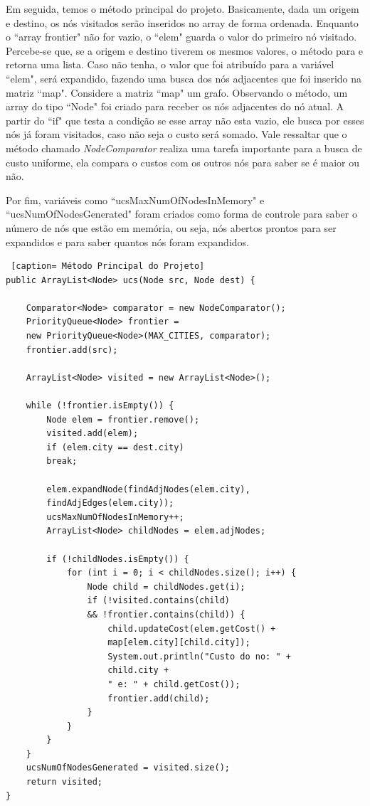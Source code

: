 \documentclass[12pt]{article}
\begin{document}
Em seguida, temos o método principal do projeto. Basicamente, dada um origem e destino, os nós visitados serão inseridos no array de forma ordenada. Enquanto o ``array frontier" não for vazio, o ``elem" guarda o valor do primeiro nó visitado. Percebe-se que, se a origem e destino tiverem os mesmos valores, o método para e retorna uma lista. Caso não tenha, o valor que foi atribuído para a variável ``elem", será expandido, fazendo uma busca dos nós adjacentes que foi inserido na matriz ``map". Considere a matriz ``map" um grafo. Observando o método, um array do tipo ``Node" foi criado para receber os nós adjacentes do nó atual. A partir do ``if" que testa a condição se esse array não esta vazio, ele busca por esses nós já foram visitados, caso não seja o custo será somado. Vale ressaltar que o método chamado \textit{NodeComparator} realiza uma tarefa importante para a busca de custo uniforme, ela compara o custos com os outros nós para saber se é maior ou não.

Por fim, variáveis como ``ucsMaxNumOfNodesInMemory" e ``ucsNumOfNodesGenerated" foram criados como forma de controle para saber o número de nós que estão em memória, ou seja, nós abertos prontos para ser expandidos e para saber quantos nós foram expandidos.
\begin{lstlisting} [caption= Método Principal do Projeto]
public ArrayList<Node> ucs(Node src, Node dest) {
	
	Comparator<Node> comparator = new NodeComparator();
	PriorityQueue<Node> frontier = 
	new PriorityQueue<Node>(MAX_CITIES, comparator);
	frontier.add(src);
	
	ArrayList<Node> visited = new ArrayList<Node>();
	
	while (!frontier.isEmpty()) {
		Node elem = frontier.remove();
		visited.add(elem);
		if (elem.city == dest.city)
		break;
			
		elem.expandNode(findAdjNodes(elem.city), 
		findAdjEdges(elem.city));
		ucsMaxNumOfNodesInMemory++;
		ArrayList<Node> childNodes = elem.adjNodes;
		
		if (!childNodes.isEmpty()) {
			for (int i = 0; i < childNodes.size(); i++) {
				Node child = childNodes.get(i);
				if (!visited.contains(child)
				&& !frontier.contains(child)) {
					child.updateCost(elem.getCost() + 
					map[elem.city][child.city]);
					System.out.println("Custo do no: " + 
					child.city +
					" e: " + child.getCost());
					frontier.add(child);
				}
			}
		}
	}
	ucsNumOfNodesGenerated = visited.size();
	return visited;
}
\end{lstlisting}
\end{document}

